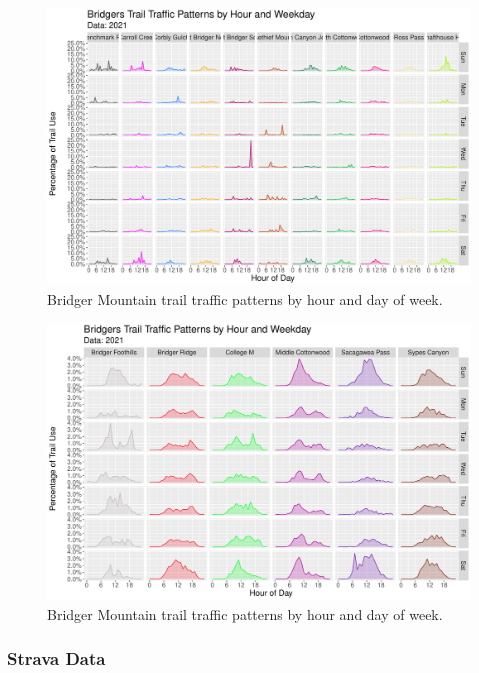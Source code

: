 \documentclass[
]{book}
\begin{document}
\begin{figure}

{\centering \includegraphics[width=1\linewidth]{../figures/hourly_bydayofweek_highuse} 

}

\caption{Bridger Mountain trail traffic patterns by hour and day of week.}\label{fig:hourly-high}
\end{figure}

\begin{figure}

{\centering \includegraphics[width=1\linewidth]{../figures/hourly_bydayofweek_lowuse} 

}

\caption{Bridger Mountain trail traffic patterns by hour and day of week.}\label{fig:hourly-low}
\end{figure}

\hypertarget{strava-data}{%
\subsubsection{Strava Data}\label{strava-data}}
\end{document}
